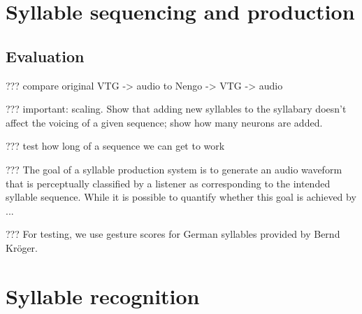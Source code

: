 
\section{Syllable sequencing and production}

\subsection{Evaluation}

??? compare original VTG -> audio to Nengo -> VTG -> audio

??? important: scaling. Show that adding new syllables
to the syllabary doesn't affect the voicing
of a given sequence; show how many neurons are added.

??? test how long of a sequence we can get to work

??? The goal of a syllable production system
is to generate an audio waveform
that is perceptually classified
by a listener as corresponding to
the intended syllable sequence.
While it is possible to quantify
whether this goal is achieved
by ...

??? For testing, we use gesture scores
for German syllables
provided by Bernd Kr\"{o}ger.

\section{Syllable recognition}
